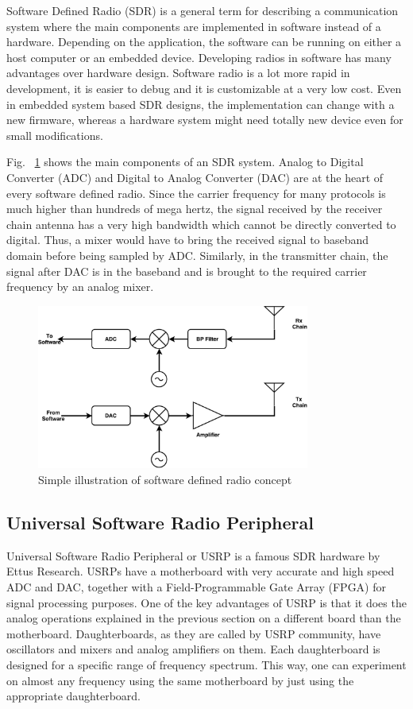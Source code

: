Software Defined Radio (SDR) is a general term for describing a communication system where the main components are implemented in software instead of a hardware. Depending on the application, the software can be running on either a host computer or an embedded device. Developing radios in software has many advantages over hardware design. Software radio is a lot more rapid in development, it is easier to debug and it is customizable at a very low cost. Even in embedded system based SDR designs, the implementation can change with a new firmware, whereas a hardware system might need totally new device even for small modifications.

Fig.~ \ref{fig:sdr} shows the main components of an SDR system. Analog to Digital Converter (ADC) and Digital to Analog Converter (DAC) are at the heart of every software defined radio. Since the carrier frequency for many protocols is much higher than hundreds of mega hertz, the signal received by the receiver chain antenna has a very high bandwidth which cannot be directly converted to digital. Thus, a mixer would have to bring the received signal to baseband domain before being sampled by ADC. Similarly, in the transmitter chain, the signal after DAC is in the baseband and is brought to the required carrier frequency by an analog mixer.

\begin{figure} [th]
    \centering
    \includegraphics[width=0.8\textwidth]{figures/sdr.pdf}
    \caption{Simple illustration of software defined radio concept} \label{fig:sdr}
\end{figure}

\subsection{Universal Software Radio Peripheral}

Universal Software Radio Peripheral or USRP is a famous SDR hardware by Ettus Research. USRPs have a motherboard with very accurate and high speed ADC and DAC, together with a Field-Programmable Gate Array (FPGA) for signal processing purposes. One of the key advantages of USRP is that it does the analog operations explained in the previous section on a different board than the motherboard. Daughterboards, as they are called by USRP community, have oscillators and mixers and analog amplifiers on them. Each daughterboard is designed for a specific range of frequency spectrum. This way, one can experiment on almost any frequency using the same motherboard by just using the appropriate daughterboard.

